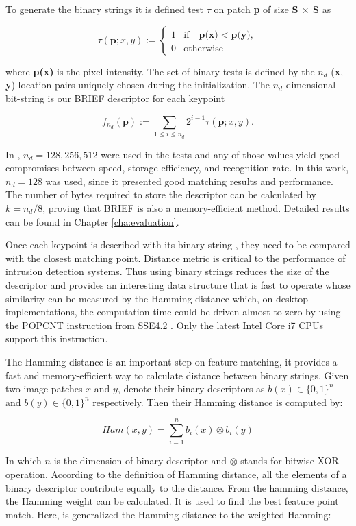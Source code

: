 To generate the binary strings it is defined test $\tau$ on patch \textbf{p} of size \textbf{S $\times$ S} as

$$\tau(\textbf{p}; x, y) :=
\begin{cases}
  1 &\mbox{if}\quad \textbf{p(x)} < \textbf{p(y)},\\
  0 &\mbox{otherwise}
\end{cases}$$

where \textbf{p(x)} is the pixel intensity. The set of binary tests is defined by the $n_{d}$ (\textbf{x}, \textbf{y})-location pairs uniquely chosen during the initialization. The $n_{d}$-dimensional bit-string is our BRIEF descriptor for each keypoint

$$f_{n_{d}}(\textbf{p}) := \sum_{1 \le i \le n_{d}} 2^{i-1} \tau(\textbf{p}; x, y).$$

In \cite{Calonder2010}, $n_{d}= 128, 256, 512$ were used in the tests and any of those values yield good compromises between speed, storage efficiency, and recognition rate. In this work, $n_{d}= 128$ was used, since it presented good matching results and performance. The number of bytes required to store the descriptor can be calculated by $k = n_{d}/8$, proving that BRIEF is also a memory-efficient method. Detailed results can be found in Chapter \ref{cha:evaluation}.

Once each keypoint is described with its binary string \cite{Calonder2010}, they need to be compared with the closest matching point. Distance metric is critical to the performance of intrusion detection systems. Thus using binary strings reduces the size of the descriptor and provides an interesting data structure that is fast to operate whose similarity can be measured by the Hamming distance which, on desktop implementations, the computation time could be driven almost to zero by using the POPCNT instruction from SSE4.2 \cite{Intel2007}. Only the latest Intel Core i7 CPUs support this instruction.

The Hamming distance is an important step on feature matching, it provides a fast and memory-efficient way to calculate distance between binary strings. Given two image patches $x$ and $y$, denote their binary descriptors as $b(x) \in \{0,1\}^n$ and $b(y) \in \{0,1\}^n$ respectively. Then their Hamming distance is computed by:

$$Ham(x, y)=\sum_{i=1}^{n}b_i(x)\otimes b_i(y)$$

In which $n$ is the dimension of binary descriptor and $\otimes$ stands for bitwise XOR operation. According to the definition of Hamming distance, all the elements of a binary descriptor contribute equally to the distance. From the hamming distance, the Hamming weight can be calculated. It is used to find the best feature point match. Here, is generalized the Hamming distance to the weighted Hamming:

